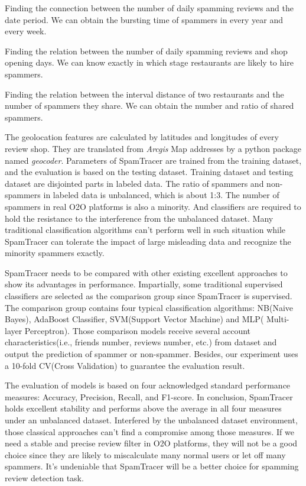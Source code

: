 \begin{bigabstract}
\begin{enumerate*}
	\item Finding the connection between the number of daily spamming reviews and the date period. We can obtain the bursting time of spammers in every year and every week.
	\item Finding the relation between the number of daily spamming reviews and shop opening days. We can know exactly in which stage restaurants are likely to hire spammers.
	\item Finding the relation between the interval distance of two restaurants and the number of spammers they share. We can obtain the number and ratio of shared spammers.
\end{enumerate*}


The geolocation features are calculated by latitudes and longitudes of every review shop. They are translated from \emph{Arcgis} Map addresses by a python package named \emph{geocoder}. Parameters of SpamTracer are trained from the training dataset, and the evaluation is based on the testing dataset. Training dataset and testing dataset are disjointed parts in labeled data. The ratio of spammers and non-spammers in labeled data is unbalanced, which is about 1:3. The number of spammers in real O2O platforms is also a minority. And classifiers are required to hold the resistance to the interference from the unbalanced dataset. Many traditional classification algorithms can't perform well in such situation while SpamTracer can tolerate the impact of large misleading data and recognize the minority spammers exactly.

SpamTracer needs to be compared with other existing excellent approaches to show its advantages in performance. Impartially, some traditional supervised classifiers are selected as the comparison group since SpamTracer is supervised. The comparison group contains four typical classification algorithms: NB(Naive Bayes), AdaBoost Classifier, SVM(Support Vector Machine) and MLP( Multi-layer Perceptron). Those comparison models receive several account characteristics(i.e., friends number, reviews number, etc.) from dataset and output the prediction of spammer or non-spammer. Besides, our experiment uses a 10-fold CV(Cross Validation) to guarantee the evaluation result.

The evaluation of models is based on four acknowledged standard performance measures: Accuracy, Precision, Recall, and F1-score. In conclusion, SpamTracer holds excellent stability and performs above the average in all four measures under an unbalanced dataset. Interfered by the unbalanced dataset environment, those classical approaches can't find a compromise among those measures. If we need a stable and precise review filter in O2O platforms, they will not be a good choice since they are likely to miscalculate many normal users or let off many spammers. It's undeniable that SpamTracer will be a better choice for spamming review detection task.


\end{bigabstract}
